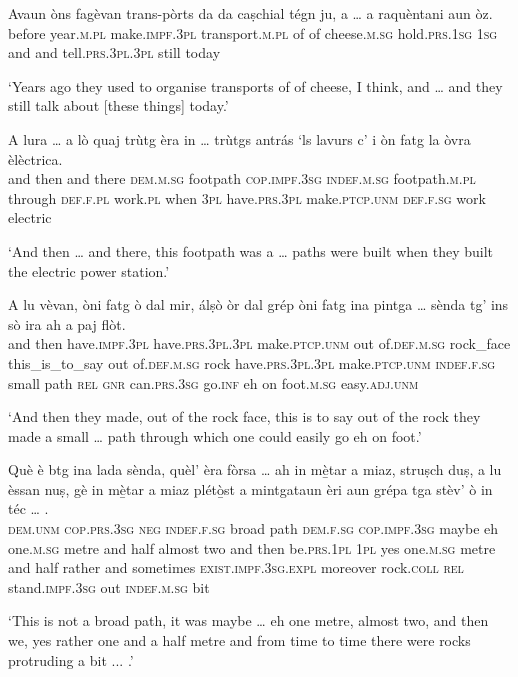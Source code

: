 \begin{linenumbers}
\gll Avaun òns fagèvan trans-pòrts da da caṣchial\footnotemark{} tégn ju, a … a raquèntani aun òz.   \\
 before year.\textsc{m.pl} make.\textsc{impf.3pl} transport.\textsc{m.pl} of of cheese.\textsc{m.sg} hold.\textsc{prs.1sg} \textsc{1sg} and {} and  tell.\textsc{prs.3pl.3pl} still today\\
\end{linenumbers}
\medskip
\glt `Years ago they used to organise transports of of cheese, I think, and … and they still talk about [these things] today.'
\medskip

\begin{linenumbers}
\gll A lura … a lò quaj trùtg èra in … trùtgs antrás `ls lavurs c' i òn fatg la òvra èlèctrica.\\
and then {}  and there \textsc{dem.m.sg} footpath  \textsc{cop.impf.3sg} \textsc{indef.m.sg} {} footpath.\textsc{m.pl} through \textsc{def.f.pl}  work.\textsc{pl} when \textsc{3pl} have.\textsc{prs.3pl} make.\textsc{ptcp.unm} \textsc{def.f.sg} work electric \\
\end{linenumbers}
\medskip
\glt `And then … and there, this footpath was a … paths were built when they built the electric power station.'
\medskip

\begin{linenumbers}
\gll  A lu vèvan, òni fatg ò dal mir, álṣò òr dal grép òni fatg ina pintga …  sènda tg’ ins sò ira ah a paj flòt.\\
and then have.\textsc{impf.3pl} have.\textsc{prs.3pl.3pl} make.\textsc{ptcp.unm} out of.\textsc{def.m.sg} rock\_face this\_is\_to\_say out of.\textsc{def.m.sg} rock have.\textsc{prs.3pl.3pl} make.\textsc{ptcp.unm} \textsc{indef.f.sg} small {} path \textsc{rel} \textsc{gnr} can.\textsc{prs.3sg} go.\textsc{inf} eh on foot.\textsc{m.sg} easy.\textsc{adj.unm} \\
\end{linenumbers}
\medskip
\glt `And then they made, out of the rock face, this is to say out of the rock they made a small … path through which one could easily go eh on foot.'
\medskip 

\begin{linenumbers}
\gll   Què è btg ina lada sènda, quèl’ èra fòrsa … ah in mè̱tar a miaz, struṣch duṣ, a lu èssan nuṣ, gè in mè̱tar a miaz plétò̱st a mintgataun èri aun grépa tga stèv’ ò in téc … . \\
 \textsc{dem.unm} \textsc{cop.prs.3sg} \textsc{neg} \textsc{indef.f.sg} broad path \textsc{dem.f.sg} \textsc{cop.impf.3sg} maybe {} eh one.\textsc{m.sg} metre and half almost two and then  be.\textsc{prs.1pl} \textsc{1pl} yes one.\textsc{m.sg} metre and half rather and sometimes  \textsc{exist.impf.3sg.expl} moreover rock.\textsc{coll} \textsc{rel}  stand.\textsc{impf.3sg}  out \textsc{indef.m.sg} bit\\
\end{linenumbers}
\medskip
\glt `This is not a broad path, it was maybe … eh one metre, almost two, and then we, yes rather one and a half metre and from time to time there were rocks protruding a bit ... .'
\medskip

